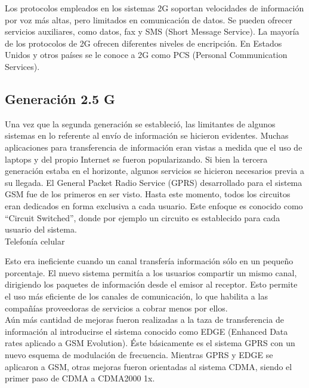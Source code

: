 \documentclass[]{article}
\begin{document}
Los protocolos empleados en los sistemas 2G soportan velocidades de información
por voz más altas, pero limitados en comunicación de datos. Se pueden ofrecer
servicios auxiliares, como datos, fax y SMS (Short Message Service). La mayoría de
los protocolos de 2G ofrecen diferentes niveles de encripción. En Estados Unidos y
otros países se le conoce a 2G como PCS (Personal Communication Services).\\

\subsection{Generación 2.5 G}

Una vez que la segunda generación se estableció, las limitantes de algunos
sistemas en lo referente al envío de información se hicieron evidentes. Muchas
aplicaciones para transferencia de información eran vistas a medida que el uso de
laptops y del propio Internet se fueron popularizando. Si bien la tercera generación
estaba en el horizonte, algunos servicios se hicieron necesarios previa a su llegada.
El General Packet Radio Service (GPRS) desarrollado para el sistema GSM fue de
los primeros en ser visto. Hasta este momento, todos los circuitos eran dedicados
en forma exclusiva a cada usuario. Este enfoque es conocido como “Circuit
Switched”, donde por ejemplo un circuito es establecido para cada usuario del sistema.\\

Telefonía celular

Esto era ineficiente cuando un canal transfería información sólo en un
pequeño porcentaje. El nuevo sistema permitía a los usuarios compartir un mismo
canal, dirigiendo los paquetes de información desde el emisor al receptor. Esto
permite el uso más eficiente de los canales de comunicación, lo que habilita a las
compañías proveedoras de servicios a cobrar menos por ellos.\\

Aún más cantidad de mejoras fueron realizadas a la taza de transferencia de
información al introducirse el sistema conocido como EDGE (Enhanced Data rates
aplicado a GSM Evolution). Éste básicamente es el sistema GPRS con un nuevo
esquema de modulación de frecuencia.
Mientras GPRS y EDGE se aplicaron a GSM, otras mejoras fueron orientadas al
sistema CDMA, siendo el primer paso de CDMA a CDMA2000 1x.\\
\end{document}
